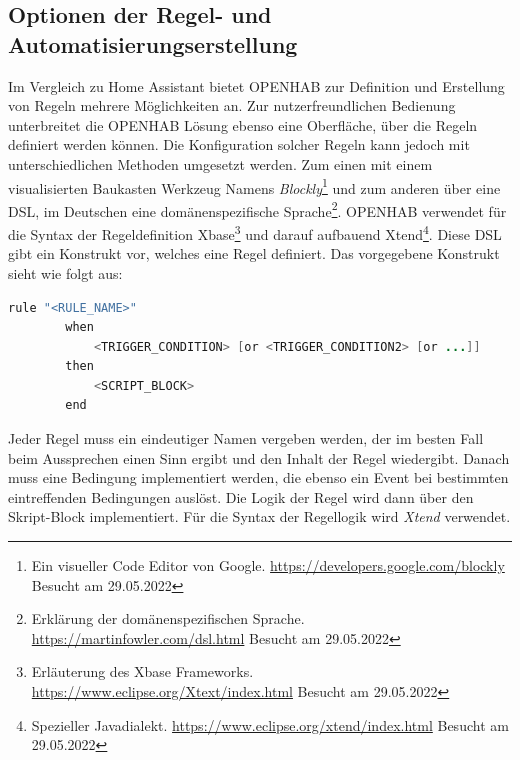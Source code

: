    \subsection{Optionen der Regel- und Automatisierungserstellung}
        Im Vergleich zu Home Assistant bietet \acs{OPENHAB} zur Definition und Erstellung von Regeln mehrere Möglichkeiten an. 
        Zur nutzerfreundlichen Bedienung unterbreitet die \acs{OPENHAB} Lösung ebenso eine Oberfläche, über die Regeln definiert 
        werden können. Die Konfiguration solcher Regeln kann jedoch mit unterschiedlichen Methoden umgesetzt werden. Zum 
        einen mit einem visualisierten Baukasten Werkzeug Namens \textit{Blockly}\footnote{Ein visueller Code Editor von Google. \url{https://developers.google.com/blockly} Besucht am 29.05.2022} 
        und zum anderen über eine \ac{DSL}, im Deutschen eine domänenspezifische Sprache\footnote{Erklärung der domänenspezifischen Sprache. \url{https://martinfowler.com/dsl.html} Besucht am 29.05.2022}. 
        \acs{OPENHAB} verwendet für die Syntax der Regeldefinition Xbase\footnote{Erläuterung des Xbase Frameworks. \url{https://www.eclipse.org/Xtext/index.html} Besucht am 29.05.2022} 
        und darauf aufbauend Xtend\footnote{Spezieller Javadialekt. \url{https://www.eclipse.org/xtend/index.html} Besucht am 29.05.2022}. 
        Diese \acs{DSL} gibt ein Konstrukt vor, welches eine Regel definiert. Das vorgegebene Konstrukt sieht wie folgt aus:
        \\
        \begin{lstlisting}[language=Java, frame=lines, xleftmargin=\parindent, style=algoBericht, label={code:Xbase}, captionpos=b, caption={Konstrukt zur Regeldefinition über Xbase}]
        rule "<RULE_NAME>"
        when
            <TRIGGER_CONDITION> [or <TRIGGER_CONDITION2> [or ...]]            
        then
            <SCRIPT_BLOCK>
        end
        \end{lstlisting}
        Jeder Regel muss ein eindeutiger Namen vergeben werden, der im besten Fall beim Aussprechen einen Sinn ergibt und den 
        Inhalt der Regel wiedergibt. Danach muss eine Bedingung implementiert werden, die ebenso ein Event bei bestimmten 
        eintreffenden Bedingungen auslöst. Die Logik der Regel wird dann über den Skript-Block implementiert. Für die Syntax 
        der Regellogik wird \textit{Xtend} verwendet. 

